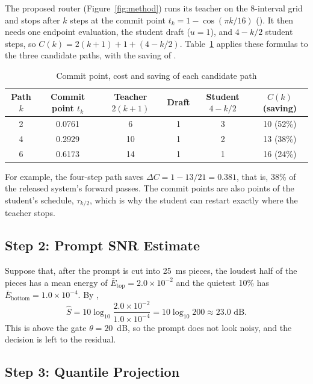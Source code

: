 The proposed router (Figure~\ref{fig:method}) runs its teacher on the 8-interval grid and stops after $k$ steps at the commit point $t_k=1-\cos(\pi k/16)$ (). It then needs one endpoint evaluation, the student draft ($u=1$), and $4-k/2$ student steps, so $C(k)=2(k+1)+1+(4-k/2)$. Table~\ref{tab:app-cost} applies these formulas to the three candidate paths, with the saving of .

\begin{table}[!htbp]
\centering\small
\caption{Commit point, cost and saving of each candidate path}
\label{tab:app-cost}
\setlength{\tabcolsep}{4pt}
\begin{tabular}{@{}c c c c c c@{}}
\toprule
\textbf{Path $k$} & \textbf{Commit point $t_k$} & \textbf{Teacher $2(k+1)$} & \textbf{Draft} & \textbf{Student $4-k/2$} & \textbf{$C(k)$ (saving)} \\
\midrule
2 & 0.0761 & 6 & 1 & 3 & 10 (52\%) \\
4 & 0.2929 & 10 & 1 & 2 & 13 (38\%) \\
6 & 0.6173 & 14 & 1 & 1 & 16 (24\%) \\
\bottomrule
\end{tabular}
\end{table}

For example, the four-step path saves $\Delta C = 1-13/21 = 0.381$, that is, 38\% of the released system's forward passes. The commit points are also points of the student's schedule, $\tau_{k/2}$, which is why the student can restart exactly where the teacher stops.

\subsection{Step 2: Prompt SNR Estimate}
\label{app:calc-snr}

Suppose that, after the prompt is cut into 25~ms pieces, the loudest half of the pieces has a mean energy of $\bar E_{\text{top}}=2.0\times10^{-2}$ and the quietest 10\% has $\bar E_{\text{bottom}}=1.0\times10^{-4}$. By ,
\[
\hat S = 10\log_{10}\frac{2.0\times10^{-2}}{1.0\times10^{-4}} = 10\log_{10}200 \approx 23.0\text{ dB}.
\]
This is above the gate $\theta=20$~dB, so the prompt does not look noisy, and the decision is left to the residual.

\subsection{Step 3: Quantile Projection}
\label{app:calc-quantile}

